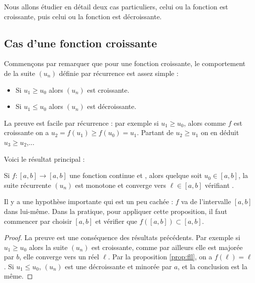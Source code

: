 \documentclass[class=report,crop=false]{standalone}
\begin{document}
Nous allons étudier en détail deux cas particuliers, celui ou la fonction est croissante, puis celui ou la fonction est décroissante. %

\subsection{Cas d'une fonction croissante}

Commençons par remarquer que pour une fonction croissante, le comportement de la suite
$(u_n)$ définie par récurrence est assez simple :
\begin{itemize}
  \item Si $u_1\ge u_0$ alors $(u_n)$ est croissante.
  \item Si $u_1 \le u_0$ alors $(u_n)$ est décroissante.
\end{itemize}

La preuve est %
facile par récurrence :
par exemple si $u_1\ge u_0$, alors comme $f$ est croissante
on a $u_2 = f(u_1)\ge f(u_0)=u_1$. Partant de $u_2\ge u_1$ on en déduit $u_3 \ge u_2$,...

\bigskip

Voici le résultat principal :
\begin{proposition}
\label{prop:fcroissante}
Si $f : [a,b] \to [a,b]$ une fonction continue et ,
alors quelque soit $u_0 \in [a,b]$, la suite récurrente $(u_n)$ est
monotone et converge vers $\ell \in [a,b]$ vérifiant .
\end{proposition}

Il y a une hypothèse importante qui est un peu cachée : $f$ va de l'intervalle $[a,b]$ dans
lui-même. Dans la pratique, pour appliquer cette proposition, il faut commencer par choisir $[a,b]$
et vérifier que $f([a,b]) \subset [a,b]$.



\begin{proof}
La preuve est une conséquence des résultats précédents.
Par exemple si $u_1\ge u_0$ alors la suite $(u_n)$ est croissante, comme par ailleurs elle est majorée par
$b$, %
elle converge vers un réel $\ell$. Par la proposition \ref{prop:fll}, %
on a $f(\ell)=\ell$.
Si $u_1 \le u_0$, %
$(u_n)$ est une décroissante et minorée par $a$, et la conclusion est la même.
\end{proof}
\end{document}
